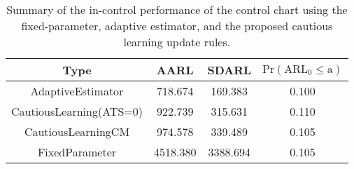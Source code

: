 \begin{table}[!h]

\caption{Summary of the in-control performance of the control chart using the fixed-parameter, adaptive estimator, and the proposed cautious learning update rules.}
\centering
\begin{tabular}[t]{cccc}
\toprule
Type & AARL & SDARL & $\text{Pr}(\text{ARL}_0 \leq \text{a})$\\
\midrule
AdaptiveEstimator & 718.674 & 169.383 & 0.100\\
CautiousLearning(ATS=0) & 922.739 & 315.631 & 0.110\\
CautiousLearningCM & 974.578 & 339.489 & 0.105\\
FixedParameter & 4518.380 & 3388.694 & 0.105\\
\bottomrule
\end{tabular}
\end{table}
